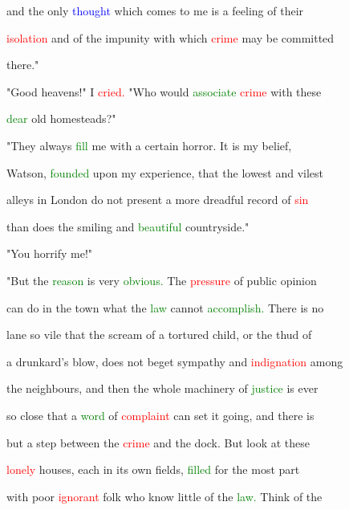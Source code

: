  and the only \textcolor{blue}{thought} which comes to me is a feeling of their

 \textcolor{red}{isolation} and of the impunity with which \textcolor{red}{crime} may be committed

 there."



 \textcolor{BurntOrange}{"Good} heavens!" I \textcolor{red}{cried.} "Who would \textcolor{green}{associate} \textcolor{red}{crime} with these

 \textcolor{green}{dear} old homesteads?"



 "They always \textcolor{green}{fill} me with a certain \textcolor{BurntOrange}{horror.} It is my belief,

 Watson, \textcolor{green}{founded} upon my experience, that the lowest and vilest

 alleys in London do not \textcolor{BurntOrange}{present} a more \textcolor{BurntOrange}{dreadful} record of \textcolor{red}{sin}

 than does the \textcolor{BurntOrange}{smiling} and \textcolor{green}{beautiful} countryside."



 "You horrify me!"



 "But the \textcolor{green}{reason} is very \textcolor{green}{obvious.} The \textcolor{red}{pressure} of \textcolor{BurntOrange}{public} opinion

 can do in the town what the \textcolor{green}{law} cannot \textcolor{green}{accomplish.} There is no

 lane so vile that the \textcolor{BurntOrange}{scream} of a \textcolor{BurntOrange}{tortured} \textcolor{BurntOrange}{child,} or the thud of

 a drunkard's blow, does not beget \textcolor{BurntOrange}{sympathy} and \textcolor{red}{indignation} among

 the neighbours, and then the whole machinery of \textcolor{green}{justice} is ever

 so close that a \textcolor{green}{word} of \textcolor{red}{complaint} can set it going, and there is

 but a step between the \textcolor{red}{crime} and the dock. But look at these

 \textcolor{red}{lonely} houses, each in its own fields, \textcolor{green}{filled} for the most part

 with poor \textcolor{red}{ignorant} folk who know little of the \textcolor{green}{law.} Think of the

